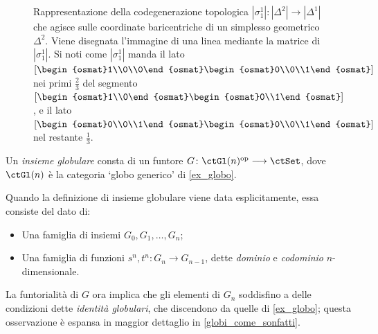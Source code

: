 \begin{figure}
 \caption{Rappresentazione della codegenerazione topologica \(|\sigma_1^1|	\colon |\Delta^{2}|\to |\Delta^1|\) che agisce sulle coordinate baricentriche di un simplesso geometrico \(\Delta^2\). Viene disegnata l'immagine di una linea mediante la matrice di \(|\sigma_1^1|\). Si noti come \(|\sigma_1^1|\) manda il lato \(\left[\begin{osmat}1\\0\\0\end{osmat}\begin{osmat}0\\0\\1\end{osmat}\right]\) nei primi \(\frac 23\) del segmento \([\begin{osmat}1\\0\end{osmat}\begin{osmat}0\\1\end{osmat}]\), e il lato \(\left[\begin{osmat}0\\0\\1\end{osmat}\begin{osmat}0\\0\\1\end{osmat}\right]\) nel restante \(\frac 13\).}\label{fig_codegen_top}
\end{figure}
\begin{definition}\label{def_insieme_globulare}
 Un \emph{insieme globulare} consta di un funtore \(G \colon \ctGl(n)^\op\fun\ctSet\), dove \(\ctGl(n)\) è la categoria `globo generico' di \ref{ex_globo}.

 Quando la definizione di insieme globulare viene data esplicitamente, essa consiste del dato di:
 \begin{itemize}
  \item Una famiglia di insiemi \(G_0,G_1,\dots,G_n\);
  \item Una famiglia di funzioni \(s^n,t^n \colon G_n\to G_{n-1}\), dette \emph{dominio} e \emph{codominio} \(n\)-dimensionale.
 \end{itemize}
 La funtorialità di \(G\) ora implica che gli elementi di \(G_n\) soddisfino a delle condizioni dette \emph{identità globulari}, che discendono da quelle di \ref{ex_globo}; questa osservazione è espansa in maggior dettaglio in \ref{globi_come_sonfatti}.
\end{definition}
